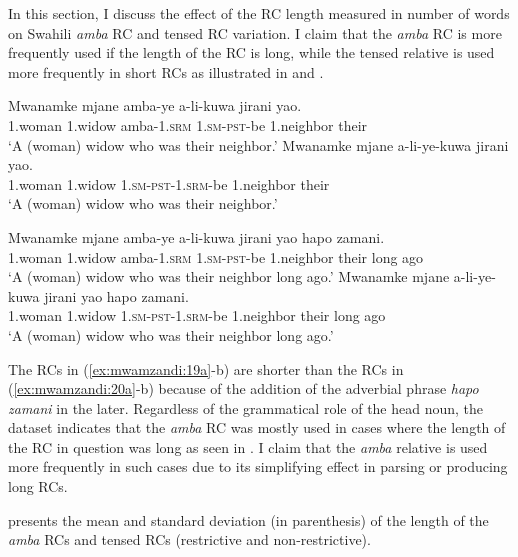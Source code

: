 \documentclass[output=paper,colorlinks,citecolor=brown]{langscibook}
\begin{document}
In this section, I discuss the effect of the RC length measured in number of words on Swahili \textit{amba} RC and tensed RC variation. I claim that the \textit{amba} RC is more frequently used if the length of the RC is long, while the tensed relative is used more frequently in short RCs as illustrated in  and .

\ea%
    \label{ex:mwamzandi:19}
    \ea%
    \label{ex:mwamzandi:19a}
    \gll    Mwanamke mjane amba-ye a-li-kuwa jirani yao.\\
            1.woman 1.widow amba\textsc{-1.srm} \textsc{1.sm-pst-}be 1.neighbor their\\
    \glt    ‘A (woman) widow who was their neighbor.’
    \ex%
    \label{ex:mwamzandi:19b}
    \gll    Mwanamke mjane a-li-ye-kuwa jirani yao.\\
            1.woman  1.widow  \textsc{1.sm-pst-1.srm-}be 1.neighbor their\\
    \glt    ‘A (woman) widow who was their neighbor.’
    \z
\z

\ea%
    \label{ex:mwamzandi:20}
    \ea%
    \label{ex:mwamzandi:20a}
    \gll    Mwanamke mjane amba-ye a-li-kuwa jirani yao hapo zamani.\\
            1.woman  1.widow  amba\textsc{-1.srm} \textsc{1.sm-pst-}be 1.neighbor their long ago\\
    \glt    ‘A (woman) widow who was their neighbor long ago.’
    \ex%
    \label{ex:mwamzandi:20b}
    \gll    Mwanamke mjane a-li-ye-kuwa jirani yao hapo zamani.\\
            1.woman 1.widow \textsc{1.sm-pst-1.srm-}be 1.neighbor their long ago\\
    \glt    ‘A (woman) widow who was their neighbor long ago.’
    \z
\z

The RCs in (\ref{ex:mwamzandi:19a}-b) are shorter than the RCs in (\ref{ex:mwamzandi:20a}-b) because of the addition of the adverbial phrase \textit{hapo zamani} in the later. Regardless of the grammatical role of the head noun, the dataset indicates that the \textit{amba} RC was mostly used in cases where the length of the RC in question was long as seen in . I claim that the \textit{amba} relative is used more frequently in such cases due to its simplifying effect in parsing or producing long RCs.

 presents the mean and standard deviation (in parenthesis) of the length of the \textit{amba} RCs and tensed RCs (restrictive and non-restrictive).
\end{document}
